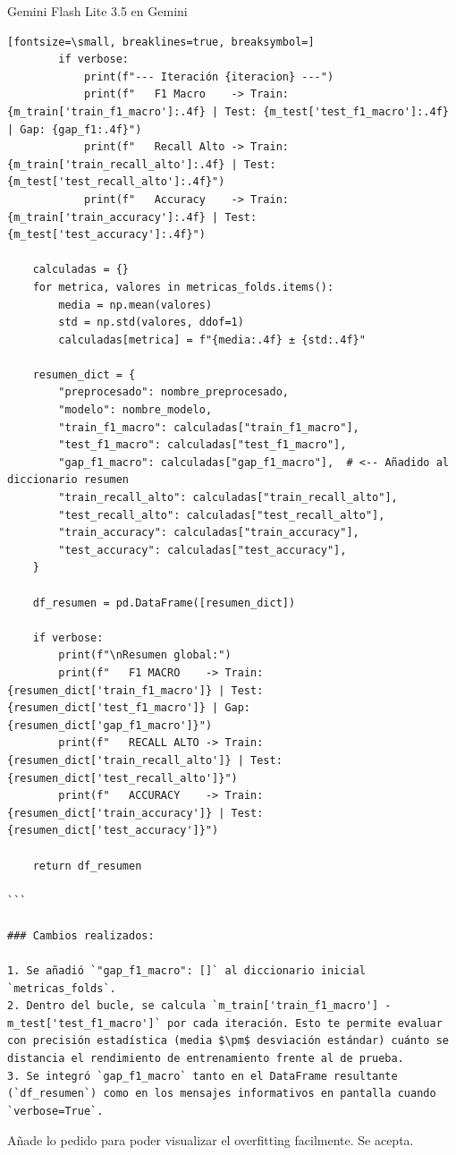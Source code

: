 \documentclass[12pt,a4paper,oneside]{book}
\begin{document}
\begin{iaresp}{Gemini Flash Lite 3.5 en Gemini}
\begin{Verbatim}[fontsize=\small, breaklines=true, breaksymbol=]
        if verbose:
            print(f"--- Iteración {iteracion} ---")
            print(f"   F1 Macro    -> Train: {m_train['train_f1_macro']:.4f} | Test: {m_test['test_f1_macro']:.4f} | Gap: {gap_f1:.4f}")
            print(f"   Recall Alto -> Train: {m_train['train_recall_alto']:.4f} | Test: {m_test['test_recall_alto']:.4f}")
            print(f"   Accuracy    -> Train: {m_train['train_accuracy']:.4f} | Test: {m_test['test_accuracy']:.4f}")
            
    calculadas = {}
    for metrica, valores in metricas_folds.items():
        media = np.mean(valores)
        std = np.std(valores, ddof=1)
        calculadas[metrica] = f"{media:.4f} ± {std:.4f}"
        
    resumen_dict = {
        "preprocesado": nombre_preprocesado,
        "modelo": nombre_modelo,
        "train_f1_macro": calculadas["train_f1_macro"],
        "test_f1_macro": calculadas["test_f1_macro"],
        "gap_f1_macro": calculadas["gap_f1_macro"],  # <-- Añadido al diccionario resumen
        "train_recall_alto": calculadas["train_recall_alto"],
        "test_recall_alto": calculadas["test_recall_alto"],
        "train_accuracy": calculadas["train_accuracy"],
        "test_accuracy": calculadas["test_accuracy"],
    }
    
    df_resumen = pd.DataFrame([resumen_dict])
    
    if verbose:
        print(f"\nResumen global:")
        print(f"   F1 MACRO    -> Train: {resumen_dict['train_f1_macro']} | Test: {resumen_dict['test_f1_macro']} | Gap: {resumen_dict['gap_f1_macro']}")
        print(f"   RECALL ALTO -> Train: {resumen_dict['train_recall_alto']} | Test: {resumen_dict['test_recall_alto']}")
        print(f"   ACCURACY    -> Train: {resumen_dict['train_accuracy']} | Test: {resumen_dict['test_accuracy']}")
        
    return df_resumen

```

### Cambios realizados:

1. Se añadió `"gap_f1_macro": []` al diccionario inicial `metricas_folds`.
2. Dentro del bucle, se calcula `m_train['train_f1_macro'] - m_test['test_f1_macro']` por cada iteración. Esto te permite evaluar con precisión estadística (media $\pm$ desviación estándar) cuánto se distancia el rendimiento de entrenamiento frente al de prueba.
3. Se integró `gap_f1_macro` tanto en el DataFrame resultante (`df_resumen`) como en los mensajes informativos en pantalla cuando `verbose=True`.
\end{Verbatim}
\end{iaresp}
\begin{iaanalisis}
Añade lo pedido para poder visualizar el overfitting facilmente. Se acepta.
\end{iaanalisis}
\end{document}
